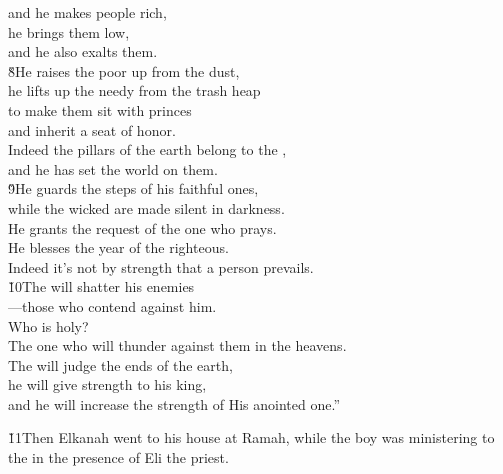 \begin{poetry}
\poemll    and he makes people rich, \\
\poeml he brings them low, \\
\poemll    and he also exalts them. \\
\poeml \v{8}He raises the poor up from the dust, \\
\poemll    he lifts up the needy from the trash heap \\
\poeml to make them sit with princes \\
\poemll    and inherit a seat of honor. \\
\poeml Indeed the pillars of the earth belong to the , \\
\poemll    and he has set the world on them. \\
\poeml \v{9}He guards the steps of his faithful ones, \\
\poemll    while the wicked are made silent in darkness. \\
\poeml He grants the request of the one who prays. \\
\poemll    He blesses the year of the righteous. \\
\poeml Indeed it's not by strength that a person prevails. \\
\poeml \v{10}The  will shatter his enemies \\
\poemll    ---those who contend against him. \\
\poeml Who is holy? \\
\poemll    The one who will thunder against them in the heavens. \\
\poeml The  will judge the ends of the earth, \\
\poemll    he will give strength to his king, \\
\poemlll       and he will increase the strength of His anointed one.''
\end{poetry}

\v{11}Then Elkanah went to his house at Ramah, while the boy was ministering to the  in the presence of Eli the priest.

